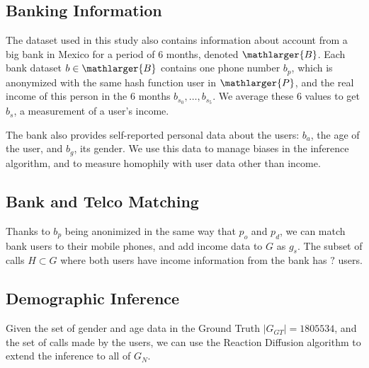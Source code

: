 \subsection{Banking Information}

The dataset used in this study also contains information about account from a big bank in Mexico for a period of 6 months, denoted \( \mathlarger{B} \). Each bank dataset \( b \in \mathlarger{B} \) contains one phone number \( b_p \), which is anonymized with the same hash function user in \( \mathlarger{P} \), and the real income of this person in the 6 months \( b_{s_0}, \ldots, b_{s_5} \). We average these 6 values to get \( b_s \), a measurement of a user's income.

The bank also provides self-reported personal data about the users: \( b_a \), the age of the user, and \( b_g \), its gender. We use this data to manage biases in the inference algorithm, and to measure homophily with user data other than income.

\subsection{Bank and Telco Matching}

Thanks to \( b_p \) being anonimized in the same way that \( p_o \) and \( p_d \), we can match bank users to their mobile phones, and add income data to \( G \) as \( g_s \). The subset of calls \( H \subset G \) where both users have income information from the bank has \( ? \) users.


\subsection{Demographic Inference}

Given the set of gender and age data in the Ground Truth \( \left| G_{GT} \right| = 1805534 \), and the set of calls made by the users, we can use the Reaction Diffusion algorithm \cite{brea2014} to extend the inference to all of \( G_N \).



